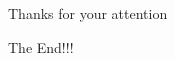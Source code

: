 \documentclass[a4paper,9pt]{beamer}
\begin{document}
\subsection{}
\begin{frame}[fragile]{Thanks for your attention}

The End!!!


\end{frame}



\end{document}
